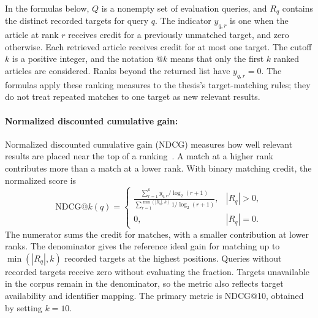 In the formulas below, \(Q\) is a nonempty set of evaluation queries, and \(R_q\) contains the distinct recorded targets for query \(q\). The indicator \(y_{q,r}\) is one when the article at rank \(r\) receives credit for a previously unmatched target, and zero otherwise. Each retrieved article receives credit for at most one target. The cutoff \(k\) is a positive integer, and the notation @\(k\) means that only the first \(k\) ranked articles are considered. Ranks beyond the returned list have \(y_{q,r}=0\). The formulas apply these ranking measures to the thesis's target-matching rules; they do not treat repeated matches to one target as new relevant results.

\paragraph{Normalized discounted cumulative gain:}
Normalized discounted cumulative gain (NDCG) measures how well relevant results are placed near the top of a ranking~\cite{jarvelin2002,manning2008}. A match at a higher rank contributes more than a match at a lower rank. With binary matching credit, the normalized score is
\[
\mathrm{NDCG}@k(q)=
\begin{cases}
\displaystyle\frac{\sum_{r=1}^{k}y_{q,r}/\log_2(r+1)}
{\sum_{r=1}^{\min(|R_q|,k)}1/\log_2(r+1)}, & |R_q|>0,\\[6pt]
0, & |R_q|=0.
\end{cases}
\]
The numerator sums the credit for matches, with a smaller contribution at lower ranks. The denominator gives the reference ideal gain for matching up to \(\min(|R_q|,k)\) recorded targets at the highest positions. Queries without recorded targets receive zero without evaluating the fraction. Targets unavailable in the corpus remain in the denominator, so the metric also reflects target availability and identifier mapping. The primary metric is NDCG@10, obtained by setting \(k=10\).


